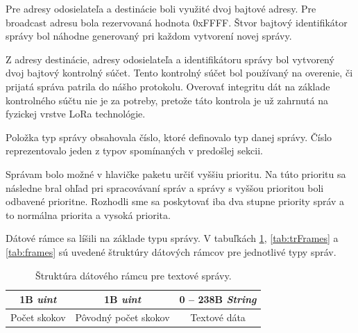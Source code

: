 \documentclass[slovak,master]{diploma}
\begin{document}
Pre adresy odosielateľa a destinácie boli využité dvoj bajtové adresy. Pre broadcast adresu bola rezervovaná hodnota 0xFFFF. 
Štvor bajtový identifikátor správy bol náhodne generovaný pri každom vytvorení novej správy.

Z adresy destinácie, adresy odosielateľa a identifikátoru správy bol vytvorený dvoj bajtový kontrolný súčet. Tento kontrolný súčet bol používaný na overenie, či prijatá správa 
patrila do nášho protokolu. Overovať integritu dát na základe kontrolného súčtu nie je za potreby, pretože táto kontrola je už zahrnutá na fyzickej vrstve LoRa technológie.

Položka typ správy obsahovala číslo, ktoré definovalo typ danej správy. Číslo reprezentovalo jeden z typov spomínaných v predošlej sekcii.

Správam bolo možné v hlavičke paketu určiť vyššiu prioritu. Na túto prioritu sa následne bral ohľad pri spracovávaní správ a správy s vyššou prioritou boli odbavené prioritne. 
Rozhodli sme sa poskytovať iba dva stupne priority správ a to normálna priorita a vysoká priorita. 

Dátové rámce sa líšili na základe typu správy. V tabuľkách \ref{tab:textFrame}, \ref{tab:trFrames} a \ref{tab:frames} 
sú uvedené štruktúry dátových rámcov pre jednotlivé typy správ.


\begin{table}[!h]
	\centering
  \caption{Štruktúra dátového rámcu pre textové správy.}
  \begin{tabular}{|c|c|c|}
    \toprule
    1B \emph{uint} & 1B \emph{uint} & 0 -- 238B \emph{String} \\
    \midrule
    Počet skokov & Pôvodný počet skokov & Textové dáta \\
    \midrule
  \end{tabular}
  \label{tab:textFrame}
\end{table}

\begin{table}[h!]
  \centering
  \qquad
  \caption{Štruktúra dátového rámcu pre správy typu traceroute.}
  \label{tab:trFrames}
\end{table}
\end{document}
